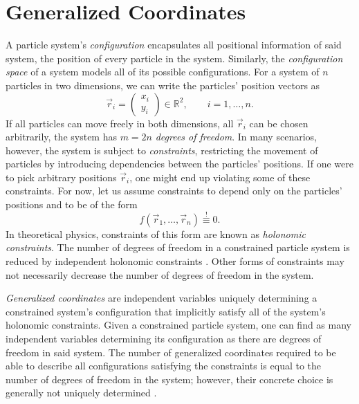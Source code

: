 \chapter{Generalized Coordinates}
\label{chap:generalized-coordinates}

A particle system's \emph{configuration} encapsulates all positional information of said system, \ie{} the position of every particle in the system. Similarly, the \emph{configuration space} of a system models all of its possible configurations. For a system of ${n}$ particles in two dimensions, we can write the particles' position vectors as
%
\begin{equation*}
  \vec{r}_i = \begin{pmatrix} x_i \\ y_i \end{pmatrix} \in \mathbb{R}^2, \qquad i = 1, \ldots, n.
\end{equation*}
%
If all particles can move freely in both dimensions, \ie{} all ${\vec{r}_i}$ can be chosen arbitrarily, the system has ${m = 2n}$ \emph{degrees of freedom}. In many scenarios, however, the system is subject to \emph{constraints}, restricting the movement of particles by introducing dependencies between the particles' positions. If one were to pick arbitrary positions ${\vec{r}_i}$, one might end up violating some of these constraints. For now, let us assume constraints to depend only on the particles' positions and to be of the form
%
\begin{equation}
  f(\vec{r}_1, \ldots, \vec{r}_n) \stackrel{!}{\equiv} 0.
  \label{eqn:holonomic-constraint}
\end{equation}
%
In theoretical physics, constraints of this form are known as \emph{holonomic constraints}. The number of degrees of freedom in a constrained particle system is reduced by independent holonomic constraints \cite{Henneaux}. Other forms of constraints may not necessarily decrease the number of degrees of freedom in the system.

\emph{Generalized coordinates} are independent variables uniquely determining a constrained system's configuration that implicitly satisfy all of the system's holonomic constraints. Given a constrained particle system, one can find as many independent variables determining its configuration as there are degrees of freedom in said system. The number of generalized coordinates required to be able to describe all configurations satisfying the constraints is equal to the number of degrees of freedom in the system; however, their concrete choice is generally not uniquely determined \cite{Muehlleitner, Fliessbach}.

